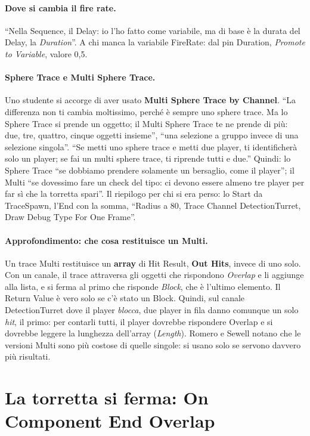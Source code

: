 \paragraph{Dove si cambia il fire rate.} ``Nella Sequence, il Delay: io l'ho fatto come
variabile, ma di base è la durata del Delay, la \emph{Duration}''. A chi manca la
variabile FireRate: dal pin Duration, \emph{Promote to Variable}, valore 0,5.

\paragraph{Sphere Trace e Multi Sphere Trace.} Uno studente si accorge di aver usato
\textbf{Multi Sphere Trace by Channel}. ``La differenza non ti cambia moltissimo, perché
è sempre uno sphere trace. Ma lo Sphere Trace si prende un oggetto; il Multi Sphere Trace
te ne prende di più: due, tre, quattro, cinque oggetti insieme'', ``una selezione a
gruppo invece di una selezione singola''. ``Se metti uno sphere trace e metti due player,
ti identificherà solo un player; se fai un multi sphere trace, ti riprende tutti e due.''
Quindi: lo Sphere Trace ``se dobbiamo prendere solamente un bersaglio, come il player'';
il Multi ``se dovessimo fare un check del tipo: ci devono essere almeno tre player per
far sì che la torretta spari''. Il riepilogo per chi si era perso: lo Start da
TraceSpawn, l'End con la somma, ``Radius a 80, Trace Channel DetectionTurret, Draw Debug
Type For One Frame''.

\paragraph{Approfondimento: che cosa restituisce un Multi.} Un trace Multi restituisce un
\textbf{array} di Hit Result, \textbf{Out Hits}, invece di uno solo. Con un canale, il
trace attraversa gli oggetti che rispondono \emph{Overlap} e li aggiunge alla lista, e si
ferma al primo che risponde \emph{Block}, che è l'ultimo elemento. Il Return Value è vero
solo se c'è stato un Block. Quindi, sul canale DetectionTurret dove il player
\emph{blocca}, due player in fila danno comunque un solo \emph{hit}, il primo: per
contarli tutti, il player dovrebbe rispondere Overlap e si dovrebbe leggere la lunghezza
dell'array (\emph{Length}). Romero e Sewell notano che le versioni Multi sono più costose
di quelle singole: si usano solo se servono davvero più risultati.

\section{La torretta si ferma: On Component End Overlap}
\label{ue5:sec:endoverlap}

